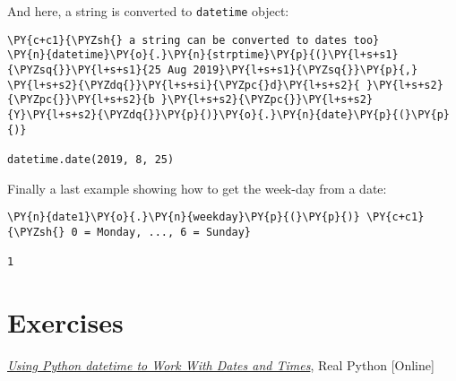 And here, a string is converted to \texttt{datetime} object:

\begin{codebox}
\begin{Verbatim}[commandchars=\\\{\}]
\PY{c+c1}{\PYZsh{} a string can be converted to dates too}
\PY{n}{datetime}\PY{o}{.}\PY{n}{strptime}\PY{p}{(}\PY{l+s+s1}{\PYZsq{}}\PY{l+s+s1}{25 Aug 2019}\PY{l+s+s1}{\PYZsq{}}\PY{p}{,} \PY{l+s+s2}{\PYZdq{}}\PY{l+s+si}{\PYZpc{}d}\PY{l+s+s2}{ }\PY{l+s+s2}{\PYZpc{}}\PY{l+s+s2}{b }\PY{l+s+s2}{\PYZpc{}}\PY{l+s+s2}{Y}\PY{l+s+s2}{\PYZdq{}}\PY{p}{)}\PY{o}{.}\PY{n}{date}\PY{p}{(}\PY{p}{)}

datetime.date(2019, 8, 25)
\end{Verbatim}
\end{codebox}

Finally a last example showing how to get the week-day from a date:

\begin{codebox}
\begin{Verbatim}[commandchars=\\\{\}]
\PY{n}{date1}\PY{o}{.}\PY{n}{weekday}\PY{p}{(}\PY{p}{)} \PY{c+c1}{\PYZsh{} 0 = Monday, ..., 6 = Sunday}

1
\end{Verbatim}
\end{codebox}

\section{Exercises}


\begin{thebibliography}{9}
 \href{https://realpython.com/python-datetime/}{\emph{Using Python datetime to Work With Dates and Times}}, Real Python [Online]
\end{thebibliography}